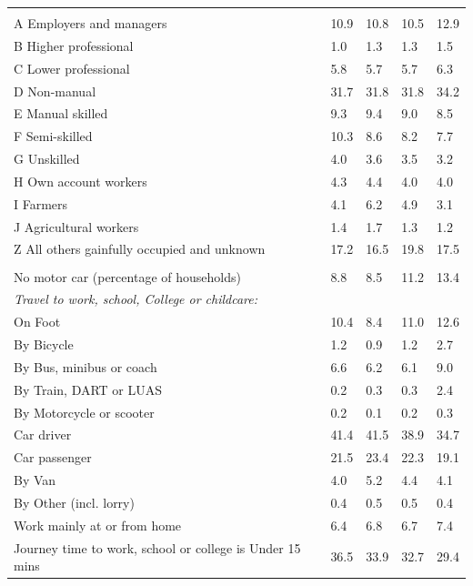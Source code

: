 \documentclass{article}
\begin{document}
\begin{table}[h]
\begin{tabular}{KTTTT}
\hline
    \\ 
    \hline
A Employers and managers & 10.9& 10.8& 10.5& 12.9\\
B Higher professional & 1.0& 1.3& 1.3& 1.5\\
C Lower professional & 5.8& 5.7& 5.7& 6.3\\
D Non-manual & 31.7& 31.8& 31.8& 34.2\\
E Manual skilled & 9.3& 9.4& 9.0& 8.5\\
F Semi-skilled & 10.3&  8.6&  8.2&  7.7\\
G Unskilled & 4.0& 3.6& 3.5& 3.2\\
H Own account workers & 4.3& 4.4& 4.0& 4.0\\
I Farmers & 4.1& 6.2& 4.9& 3.1\\
J Agricultural workers & 1.4& 1.7& 1.3& 1.2\\
Z All others gainfully occupied and unknown & 17.2& 16.5& 19.8& 17.5\\
\hline
{}\hline
    \\ 
    \hline
No motor car (percentage of households) &  8.8&  8.5& 11.2& 
13.4\\
    \hline 
\emph{Travel to work, school, College or childcare:} & & & \\
\quad On Foot & 10.4&  8.4& 11.0& 12.6\\ 
\quad By Bicycle & 1.2& 0.9& 1.2& 2.7\\ 
\quad By Bus, minibus or coach & 6.6& 6.2& 6.1& 9.0\\
\quad By Train, DART or LUAS & 0.2& 0.3& 0.3& 2.4\\
\quad By Motorcycle or scooter & 0.2& 0.1& 0.2& 0.3\\
\quad Car driver & 41.4 & 41.5& 38.9& 34.7\\
\quad Car passenger & 21.5& 23.4& 22.3& 19.1\\
\quad By Van & 4.0& 5.2& 4.4& 4.1\\
\quad By Other (incl. lorry) & 0.4& 0.5& 0.5& 0.4\\
    \hline
Work mainly at or from home & 6.4& 6.8& 6.7& 7.4\\
Journey time to work, school or college is Under 15 mins & 36.5& 33.9& 32.7& 29.4\\

\end{tabular}
\end{table}
\end{document}
